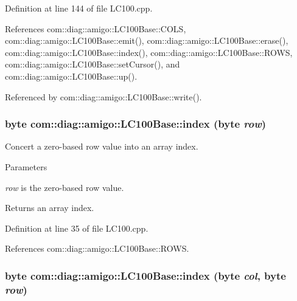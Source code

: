 Definition at line 144 of file LC100.cpp.



References com::diag::amigo::LC100Base::COLS, com::diag::amigo::LC100Base::emit(), com::diag::amigo::LC100Base::erase(), com::diag::amigo::LC100Base::index(), com::diag::amigo::LC100Base::ROWS, com::diag::amigo::LC100Base::setCursor(), and com::diag::amigo::LC100Base::up().



Referenced by com::diag::amigo::LC100Base::write().

\hypertarget{classcom_1_1diag_1_1amigo_1_1LC100Base_a2fea6d0b46f653633fdf7677b6ce1f67}{
\subsubsection[{index}]{\setlength{\rightskip}{0pt plus 5cm}byte com::diag::amigo::LC100Base::index (byte {\em row})}}
\label{classcom_1_1diag_1_1amigo_1_1LC100Base_a2fea6d0b46f653633fdf7677b6ce1f67}


Concert a zero-\/based row value into an array index. 


\begin{DoxyParams}{Parameters}
\item[{\em row}]is the zero-\/based row value. \end{DoxyParams}
\begin{DoxyReturn}{Returns}
an array index. 
\end{DoxyReturn}


Definition at line 35 of file LC100.cpp.



References com::diag::amigo::LC100Base::ROWS.

\hypertarget{classcom_1_1diag_1_1amigo_1_1LC100Base_a01be594835cd4bef65fd611bb3e995be}{
\subsubsection[{index}]{\setlength{\rightskip}{0pt plus 5cm}byte com::diag::amigo::LC100Base::index (byte {\em col}, \/  byte {\em row})}}
\label{classcom_1_1diag_1_1amigo_1_1LC100Base_a01be594835cd4bef65fd611bb3e995be}


